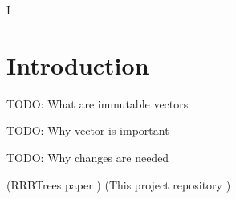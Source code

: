 I%
\lhead{} 

\chapter{Introduction} %
\label{Introduction} %



\color{red} TODO: What are immutable vectors \color{black}

\color{red} TODO: Why vector is important \color{black}

\color{red} TODO: Why changes are needed \color{black}

(RRBTrees paper \cite{RRBTrees})
(This project repository \cite{projecRepo})